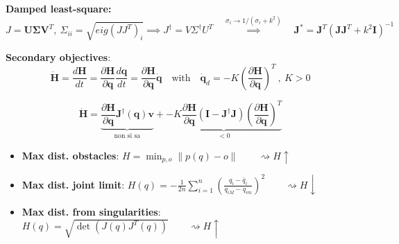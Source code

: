 \vspace*{5pt}
\textbf{Damped least-square: }
$$
J = \bm{U\Sigma V}^T , \ \Sigma_{ii} = \sqrt{eig(JJ^T)_i}
\implies
J^\dagger = V\Sigma^\dagger U^T
\quad \overset{\sigma_i \rightarrow 1/(\sigma_i + k^2)}{\implies} \quad
\bm{J}^* = \bm{J}^T(\bm{J}\bm{J}^T + k^2\bm{I})^{-1}
$$

\vspace*{10pt}
\textbf{Secondary objectives}:
\vspace*{5pt}
$$
\dot{\bm{H}}
=
\frac{d\bm{H}}{dt}
=
\frac{\partial\bm{H}}{\partial \bm{q}} \frac{d\bm{q}}{dt}
=
\frac{\partial\bm{H}}{\partial \bm{q}} \bm{\dot{q}}
\quad
\text{with}
\quad
\dot{\bm{q}}_d = -K(\frac{\partial\bm{H}}{\partial \bm{q}})^T \ , \ K > 0
$$


$$
\dot{\bm{H}}
=
\underbrace{
	\frac{\partial\bm{H}}{\partial \bm{q}} \bm{J}^{\dagger}(\bm{q})\bm{v}
}_{\text{non si sa}}
+
\underbrace{
	-K\frac{\partial\bm{H}}{\partial \bm{q}}(\bm{I} - \bm{J}^\dagger\bm{J})(\frac{\partial\bm{H}}{\partial \bm{q}})^T
}_{<0}
$$

\begin{itemize}
	\item \textbf{Max dist. obstacles}: 
	$
	H = \min_{p,o} \| p(q) - o \| \qquad \rightsquigarrow H\uparrow
	$
	
	\item \textbf{Max dist. joint limit}: 
	$
	H(q)=-{\frac{1}{2n}}\sum_{i=1}^{n}\left({\frac{q_{i}-{\bar{q}}_{i}}{q_{i M}-q_{i m}}}\right)^{2} \qquad \rightsquigarrow H\downarrow
	$

	\item \textbf{Max dist. from singularities}: 
	$
	H(q)=\sqrt{\operatorname*{det}(J(q)J^{T}(q))} \qquad \rightsquigarrow H\uparrow
	$
\end{itemize}




